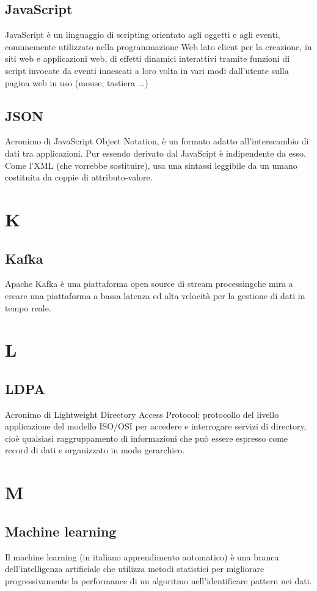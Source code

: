 \subsection*{JavaScript}
JavaScript è un linguaggio di scripting orientato agli oggetti e agli eventi, comunemente utilizzato nella programmazione Web lato client per la creazione, in siti web e applicazioni web, di effetti dinamici interattivi tramite funzioni di script invocate da eventi innescati a loro volta in vari modi dall'utente sulla pagina web in uso (mouse, tastiera ...)

\subsection*{JSON}
Acronimo di JavaScript Object Notation, è un formato adatto all'interscambio di dati tra applicazioni. Pur essendo derivato dal JavaScipt è indipendente da esso. Come l'XML (che vorrebbe sostituire), usa una sintassi leggibile da un umano costituita da coppie di attributo-valore.

\section*{K}

\subsection*{Kafka}
Apache Kafka è una piattaforma open source di stream processing\glosp che mira a creare una piattaforma a bassa latenza ed alta velocità per la gestione di dati in tempo reale. 

\section*{L}

\subsection*{LDPA}
Acronimo di  Lightweight Directory Access Protocol; protocollo del livello applicazione del modello ISO/OSI per accedere e interrogare servizi di directory, cioè  qualsiasi raggruppamento di informazioni che può essere espresso come record di dati e organizzato in modo gerarchico. 

\section*{M}
\subsection{Machine learning}
Il machine learning (in italiano apprendimento automatico) è una branca dell'intelligenza artificiale che utilizza metodi statistici per migliorare progressivamente la performance di un algoritmo nell'identificare pattern nei dati. 

